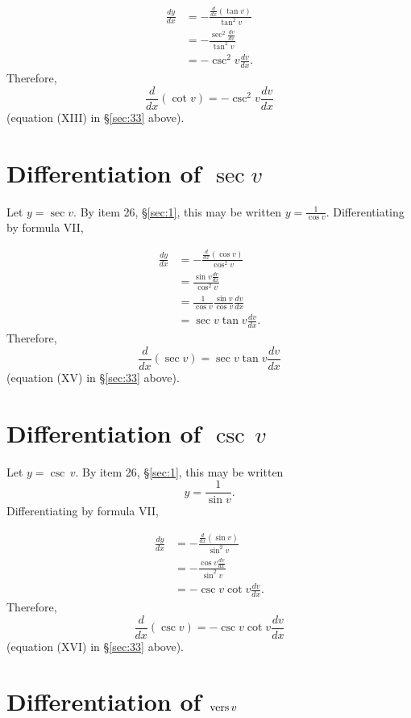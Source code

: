\[
\begin{array}{ll}
  	\frac{dy}{dx}
& 	= - \frac{\frac{d}{dx}(\tan v)}{\tan^2 v}\\
&  	= -\frac{\sec^2 \frac{dv}{dx}}{\tan^2 v} \\
& = -\csc^2 v \frac{dv}{dx}.
\end{array}
\]
Therefore, 
\[
\frac{d}{dx}(\cot v) 	= -\csc^2 v \frac{dv}{dx}
\]
(equation (XIII) in \S \ref{sec:33}  above).

\section{Differentiation of $\sec v$}

Let $y = \sec v$.
By item 26,  \S \ref{sec:1}, %
this may be written
$y 	= \frac{1}{\cos v}$.
Differentiating by formula VII,

\[
\begin{array}{ll}
\frac{dy}{dx} 
&	= -\frac{\frac{d}{dx}(\cos v)}{\cos^2 v}\\
&  	=\frac{\sin v \frac{dv}{dx}}{\cos^2 v}\\
&  	= \frac{1}{\cos v} \frac{\sin v}{\cos v} \frac{dv}{dx}\\
&  	= \sec v \tan v \frac{dv}{dx}.
\end{array}
\]
Therefore, 
\[
\frac{d}{dx}(\sec v) 	= \sec v \tan v \frac{dv}{dx}
\]
(equation (XV) in \S \ref{sec:33}  above).

\section{Differentiation of $\csc\, v$}

Let $y 	= \csc\, v$.
By item 26, \S \ref{sec:1}, %
this may be written
\[
  	y 	= \frac{1}{\sin v}.
\]
Differentiating by formula VII,

\[
\begin{array}{ll}
\frac{dy}{dx} 
&	= -\frac{\frac{d}{dx}(\sin v)}{\sin^2 v}\\
 & 	= -\frac{\cos v \frac{dv}{dx}}{\sin^2 v}\\
  &	= -\csc v \cot v \frac{dv}{dx}.
\end{array}
\]
Therefore, 
\[
\frac{d}{dx}(\csc v) 	= - \csc v \cot v \frac{dv}{dx}
\]
(equation (XVI) in \S \ref{sec:33}  above).

\section{Differentiation of ${\rm vers}\, v$}

